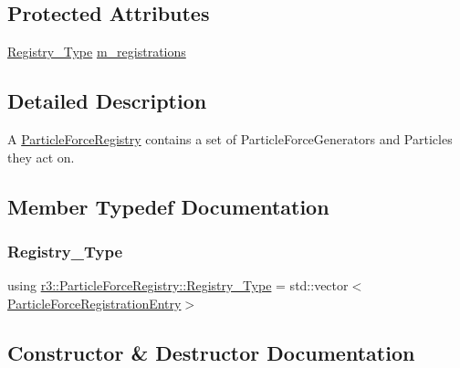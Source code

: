 \subsection*{Protected Attributes}
\begin{DoxyCompactItemize}
\item 
\mbox{\hyperlink{classr3_1_1_particle_force_registry_ae769e654dbf539cf09c514e47768498c}{Registry\+\_\+\+Type}} \mbox{\hyperlink{classr3_1_1_particle_force_registry_ac0130d368fb6f3f8894bc83b615e193f}{m\+\_\+registrations}}
\end{DoxyCompactItemize}


\subsection{Detailed Description}
A \mbox{\hyperlink{classr3_1_1_particle_force_registry}{Particle\+Force\+Registry}} contains a set of Particle\+Force\+Generators and Particles they act on. 

\subsection{Member Typedef Documentation}
\mbox{\label{classr3_1_1_particle_force_registry_ae769e654dbf539cf09c514e47768498c}} 
\subsubsection{\texorpdfstring{Registry\+\_\+\+Type}{Registry\_Type}}
{\footnotesize\ttfamily using \mbox{\hyperlink{classr3_1_1_particle_force_registry_ae769e654dbf539cf09c514e47768498c}{r3\+::\+Particle\+Force\+Registry\+::\+Registry\+\_\+\+Type}} =  std\+::vector$<$\mbox{\hyperlink{structr3_1_1_particle_force_registry_1_1_particle_force_registration_entry}{Particle\+Force\+Registration\+Entry}}$>$}



\subsection{Constructor \& Destructor Documentation}
\mbox{\label{classr3_1_1_particle_force_registry_a4ca245fb0538dbfb0c04ca49a3a226b6}} 
